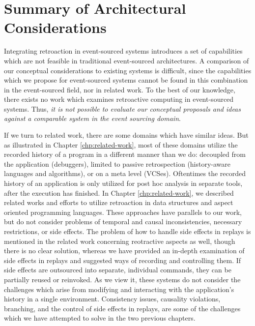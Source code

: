 \chapter{Summary of Architectural Considerations}
\label{chp:sum}

Integrating retroaction in event-sourced systems introduces a set of capabilities 
which are not feasible in traditional event-sourced architectures. 
A comparison of our conceptual considerations to existing systems is difficult, 
since the capabilities which we propose for event-sourced systems cannot be 
found in this combination in the event-sourced field, nor in related work.
To the best of our knowledge, there exists no work which examines retroactive 
computing in event-sourced systems.
Thus, \emph{it is not possible to evaluate our conceptual proposals and
ideas against a comparable system in the event sourcing domain}.

If we turn to related work, there are some domains which have similar ideas.
But as illustrated in Chapter \ref{chp:related-work}, most of these domains 
utilize the recorded history of a program in a different manner than we do: 
decoupled from the application (debuggers), limited to passive retrospection 
(history-aware languages and algorithms), or on a meta level (VCSes).
Oftentimes the recorded history of an application is only utilized for post 
hoc analysis in separate tools, after the execution has finished.
%
In Chapter \ref{chp:related-work}, we described related works and efforts to 
utilize retroaction in data structures and aspect oriented programming languages.
These approaches have parallels to our work, but do not consider problems of 
temporal and causal inconsistencies, necessary restrictions, or side effects.
The problem of how to handle side effects in replays is mentioned in the related 
work concerning reotractive aspects as well, though there is no clear solution, 
whereas we have provided an in-depth examination of side effects in replays and 
suggested ways of recording and controlling them.
If side effects are outsourced into separate, individual commands, they can be 
partially reused or reinvoked.
%
As we view it, these systems do not consider the challenges which arise from 
modifying and interacting with the application's history in a single environment. 
Consistency issues, causality violations, branching, and the control of side 
effects in replays, are some of the challenges which we have attempted to solve 
in the two previous chapters. 

